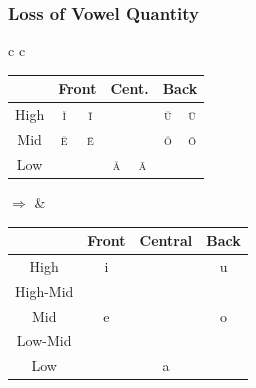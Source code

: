 \documentclass{report}[12pt]
\begin{document}
\subsubsection{Loss of Vowel Quantity}\label{sec:loss_of_quantity}

\begin{tcolorbox}
  \begin{tabular}{c c}
    \begin{tabular}{|c|c|c|c|c|c|c|}
      \hline
      & \multicolumn{2}{c|}{Front} & \multicolumn{2}{c|}{Cent.} & \multicolumn{2}{c|}{Back} \\
      \hline
      High & \cellcolor{gray} \textsc{\u{i}} & \textsc{\={i}} & & & \cellcolor{gray} \textsc{\u{u}} & \textsc{\={u}} \\
      \hline
      Mid & \cellcolor{gray} \textsc{\u{e}} & \textsc{\={e}} & & & \cellcolor{gray} \textsc{\u{o}} & \textsc{\={o}} \\
      \hline
      Low &  &  & \cellcolor{gray} \textsc{\u{a}} & \textsc{\={a}} & & \\
      \hline
    \end{tabular}
    \quad $\Rightarrow$ & 
                          \begin{tabular}{|c|c|c|c|}
                            \hline
                            & Front & Central & Back \\
                            \hline
                            High & i & & u \\
                            \hline
                            High-Mid & \cellcolor{magenta} \textipa{I} & & \cellcolor{magenta} \textipa{U} \\
                            \hline
                            Mid & e & & o \\
                            \hline
                            Low-Mid & \cellcolor{magenta} \textipa{E} & & \cellcolor{magenta} \textipa{O} \\
                            \hline
                            Low & & a & \\
                            \hline
                          \end{tabular}
  \end{tabular}
\end{tcolorbox}
\end{document}
